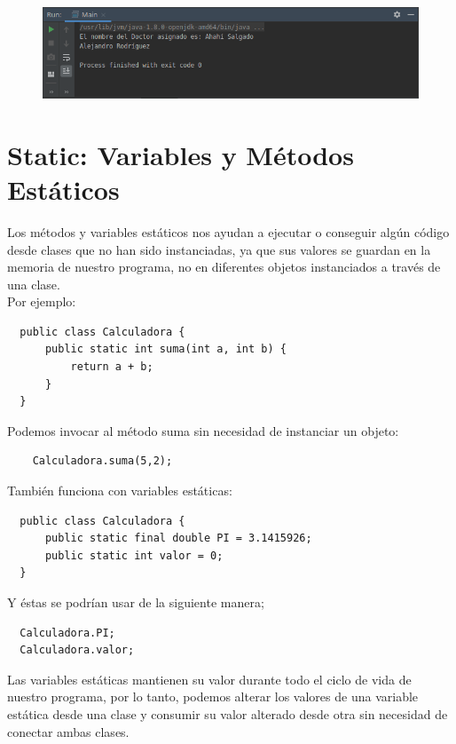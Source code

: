 \documentclass{article}
\begin{document}
\begin{figure}[h!]
  \centering
  \includegraphics[scale=0.75]{./Pictures/015_constructor.png}
\end{figure}




\section{Static: Variables y Métodos Estáticos}%
Los métodos y variables estáticos nos ayudan a ejecutar o conseguir algún
código desde clases que no han sido instanciadas, ya que sus valores se guardan
en la memoria de nuestro programa, no en diferentes objetos instanciados a
través de una clase.\\

Por ejemplo:
\begin{verbatim}
  public class Calculadora {
      public static int suma(int a, int b) {
          return a + b;
      }
  }
\end{verbatim}

Podemos invocar al método suma sin necesidad de instanciar un objeto:
\begin{verbatim}
    Calculadora.suma(5,2);
\end{verbatim}

También funciona con variables estáticas:

\begin{verbatim}
  public class Calculadora {
      public static final double PI = 3.1415926;
      public static int valor = 0;
  }
\end{verbatim}

Y éstas se podrían usar de la siguiente manera;

\begin{verbatim}
  Calculadora.PI;
  Calculadora.valor;
\end{verbatim}


Las variables estáticas mantienen su valor durante todo el ciclo de vida de
nuestro programa, por lo tanto, podemos alterar los valores de una variable
estática desde una clase y consumir su valor alterado desde otra sin necesidad
de conectar ambas clases.\\
\end{document}
